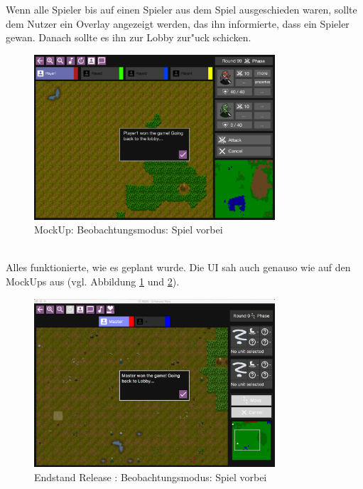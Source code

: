 \documentclass[12pt, titlepage]{scrartcl}
\newcommand{\RN}[1]{%
	\textup{\uppercase\expandafter{\romannumeral#1}}%
}
\begin{document}
					Wenn alle Spieler bis auf einen Spieler aus dem Spiel ausgeschieden waren, sollte dem Nutzer ein Overlay angezeigt werden, das ihn informierte, dass ein Spieler gewan. Danach sollte es ihn zur Lobby zur"uck schicken.
					\begin{figure}[H] 
						\centering
						\includegraphics[width=0.8\textwidth]{images/mockUps/SpectatorEnd.png}
						\caption{MockUp: Beobachtungsmodus: Spiel vorbei}
						\label{Spectator_End_2}
					\end{figure}
					\ \\ Alles funktionierte, wie es geplant wurde. Die UI sah auch genauso wie auf den MockUps aus (vgl. Abbildung \ref{Spectator_End_2} und \ref{End_Spectator_End}).
					\begin{figure}[H] 
						\centering
						\includegraphics[width=0.8\textwidth]{images/endOfRelease/SpectatorEnd.png}
						\caption{Endstand Release \RN{3}: Beobachtungsmodus: Spiel vorbei}
						\label{End_Spectator_End}
					\end{figure}
\end{document}
